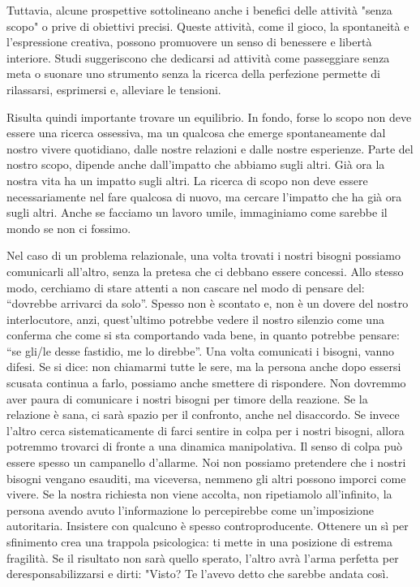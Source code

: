 \documentclass[12pt]{book} %
\begin{document}
\begin{mdframed}[linewidth=1pt]
Tuttavia, alcune prospettive sottolineano anche i benefici delle attività "senza scopo" o prive di obiettivi precisi. Queste attività, come il gioco, la spontaneità e l’espressione creativa, possono promuovere un senso di benessere e libertà interiore. Studi suggeriscono che dedicarsi ad attività come passeggiare senza meta o suonare uno strumento senza la ricerca della perfezione permette di rilassarsi, esprimersi e, alleviare le tensioni.

Risulta quindi importante trovare un equilibrio. In fondo, forse lo scopo non deve essere una ricerca ossessiva, ma un qualcosa che emerge spontaneamente dal nostro vivere quotidiano, dalle nostre relazioni e dalle nostre esperienze. Parte del nostro scopo, dipende anche dall'impatto che abbiamo sugli altri. Già ora la nostra vita ha un impatto sugli altri. La ricerca di scopo non deve essere necessariamente nel fare qualcosa di nuovo, ma cercare l'impatto che ha già ora sugli altri. Anche se facciamo un lavoro umile, immaginiamo come sarebbe il mondo se non ci fossimo.
\end{mdframed}

Nel caso di un problema relazionale, una volta trovati i nostri bisogni possiamo comunicarli all'altro, senza la pretesa che ci debbano essere concessi.
Allo stesso modo, cerchiamo di stare attenti a non cascare nel modo di pensare del: “dovrebbe arrivarci da solo”. Spesso non è scontato e, non è un dovere del nostro interlocutore, anzi, quest'ultimo potrebbe vedere il nostro silenzio come una conferma che come si sta comportando vada bene, in quanto potrebbe pensare: “se gli/le desse fastidio, me lo direbbe”. Una volta comunicati i bisogni, vanno difesi. Se si dice: non chiamarmi tutte le sere, ma la persona anche dopo essersi scusata continua a farlo, possiamo anche smettere di rispondere. Non dovremmo aver paura di comunicare i nostri bisogni per timore della reazione. Se la relazione è sana, ci sarà spazio per il confronto, anche nel disaccordo. Se invece l’altro cerca sistematicamente di farci sentire in colpa per i nostri bisogni, allora potremmo trovarci di fronte a una dinamica manipolativa. Il senso di colpa può essere spesso un campanello d'allarme. Noi non
possiamo pretendere che i nostri bisogni vengano esauditi, ma viceversa, nemmeno gli altri possono imporci come vivere. 
Se la nostra richiesta non viene accolta, non ripetiamolo all'infinito, la persona avendo avuto l'informazione lo percepirebbe come un'imposizione autoritaria. Insistere con qualcuno è spesso controproducente. Ottenere un sì per sfinimento crea una trappola psicologica: ti mette in una posizione di estrema fragilità. Se il risultato non sarà quello sperato, l'altro avrà l'arma perfetta per deresponsabilizzarsi e dirti: "Visto? Te l'avevo detto che sarebbe andata così.
\end{document}
